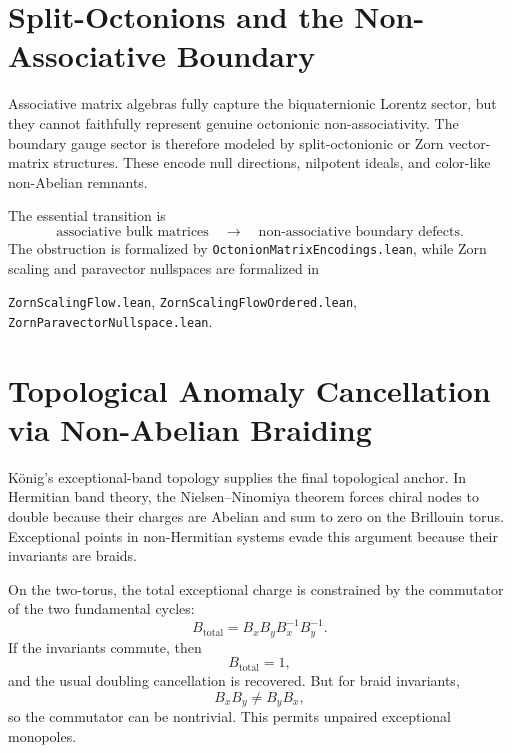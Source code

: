 \section{Split-Octonions and the Non-Associative Boundary}

Associative matrix algebras fully capture the biquaternionic Lorentz sector, but they cannot faithfully represent genuine octonionic non-associativity.  The boundary gauge sector is therefore modeled by split-octonionic or Zorn vector-matrix structures.  These encode null directions, nilpotent ideals, and color-like non-Abelian remnants.

The essential transition is
\begin{equation}
    \text{associative bulk matrices}
    \quad\longrightarrow\quad
    \text{non-associative boundary defects}.
\end{equation}
The obstruction is formalized by \texttt{OctonionMatrixEncodings.lean}, while Zorn scaling and paravector nullspaces are formalized in
\begin{center}
\texttt{ZornScalingFlow.lean},\quad
\texttt{ZornScalingFlowOrdered.lean},\quad
\texttt{ZornParavectorNullspace.lean}.
\end{center}

\section{Topological Anomaly Cancellation via Non-Abelian Braiding}

König's exceptional-band topology supplies the final topological anchor.  In Hermitian band theory, the Nielsen--Ninomiya theorem forces chiral nodes to double because their charges are Abelian and sum to zero on the Brillouin torus.  Exceptional points in non-Hermitian systems evade this argument because their invariants are braids.

On the two-torus, the total exceptional charge is constrained by the commutator of the two fundamental cycles:
\begin{equation}
    B_{\mathrm{total} }
    =B_xB_yB_x^{-1}B_y^{-1}.
\end{equation}
If the invariants commute, then
\begin{equation}
    B_{\mathrm{total}}=1,
\end{equation}
and the usual doubling cancellation is recovered.  But for braid invariants,
\begin{equation}
    B_xB_y\neq B_yB_x,
\end{equation}
so the commutator can be nontrivial.  This permits unpaired exceptional monopoles.

